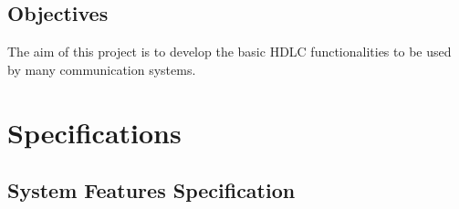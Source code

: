 \documentclass[a4paper,11pt]{article}
\begin{document}
 
\subsection{Objectives}
The aim of this project is to develop the basic HDLC functionalities to be used by many communication systems.
 
 
\section{Specifications}
 
\subsection{System Features Specification}
\end{document}
